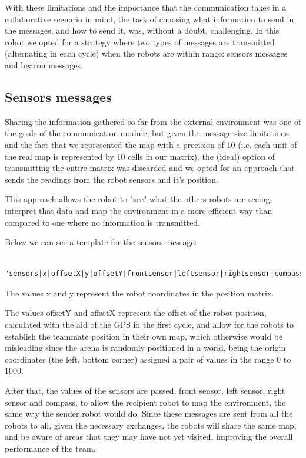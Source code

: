 \documentclass[oribibl]{llncs}
\begin{document}
With these limitations and the importance that the communication takes in a collaborative scenario in mind, the task of choosing what information to send in the messages, and how to send it, was, without a doubt, challenging. In this robot we opted for a strategy where two types of messages are transmitted (alternating in each cycle) when the robots are within range: sensors messages and beacon messages.

\subsection{Sensors messages}

Sharing the information gathered so far from the external environment was one of the goals of the communication module, but given the message size limitations, and the fact that we represented the map with a precision of 10 (i.e. each unit of the real map is represented by 10 cells in our matrix), the (ideal) option of transmitting the entire matrix was discarded and we opted for an approach that sends the readings from the robot sensors and it's position.

This approach allows the robot to "see" what the others robots are seeing, interpret that data  and map the environment in a more efficient way than compared to one where no information is transmitted.

Below we can see a template for the sensors message:

\begin{verbatim}

"sensors|x|offsetX|y|offsetY|frontsensor|leftsensor|rightsensor|compass"

\end{verbatim}

The values x and y represent the robot coordinates in the position matrix.

The values offsetY and offsetX represent the offset of the robot position, calculated with the aid of the GPS in the first cycle, and allow for the robots to establish the teammate position in their own map, which otherwise would be misleading since the arena is randomly positioned in a world, being the origin coordinates (the left, bottom corner) assigned a pair of values in the range 0 to 1000.

After that, the values of the sensors are passed, front sensor, left sensor, right sensor and compass, to allow the recipient robot to map the environment, the same way the sender robot would do.
Since these messages are sent from all the robots to all, given the necessary exchanges, the robots will share the same map, and be aware of areas that they may have not yet visited, improving the overall performance of the team.
\end{document}
